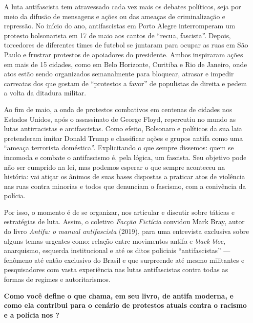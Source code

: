 

A luta antifascista tem atravessado cada vez mais os debates políticos, seja por meio da difusão de mensagens e ações ou das ameaças de criminalização e repressão. No início do ano, antifascistas em Porto Alegre interromperam um protesto bolsonarista em 17 de maio aos cantos de ``recua, fascista''. Depois, torcedores de diferentes times de futebol se juntaram para ocupar as ruas em São Paulo e frustrar protestos de apoiadores do presidente. Ambos inspiraram ações em mais de 15 cidades, como em Belo Horizonte, Curitiba e Rio de Janeiro, onde atos estão sendo organizados semanalmente para bloquear, atrasar e impedir carreatas dos que gostam de ``protestos a favor'' de populistas de direita e pedem a volta da ditadura militar.
 
Ao fim de maio, a onda de protestos combativos em centenas de cidades nos Estados Unidos, após o assassinato de George Floyd, repercutiu no mundo as lutas antirracistas e antifascistas. Como efeito, Bolsonaro e políticos da sua laia pretenderam imitar Donald Trump e classificar ações e grupos antifa como uma ``ameaça terrorista doméstica''. Explicitando o que sempre dissemos: quem se incomoda e combate o antifascismo é, pela lógica, um fascista. Seu objetivo pode não ser cumprido na lei, mas podemos esperar o que sempre aconteceu na história: vai atiçar os ânimos de suas bases dispostas a praticar atos de violência nas ruas contra minorias e todos que denunciam o fascismo, com a conivência da polícia.
 
Por isso, o momento é de se organizar, nos articular e discutir sobre táticas e estratégias de luta. Assim, o coletivo \emph{Facção Fictícia} convidou Mark Bray, autor do livro \emph{Antifa: o manual antifascista} (2019), para uma entrevista exclusiva sobre alguns temas urgentes como: relação entre movimentos antifa e \emph{black bloc}, anarquismo, esquerda institucional e até os ditos policiais ``antifascistas'' --- fenômeno até então exclusivo do Brasil e que surpreende até mesmo militantes e pesquisadores com vasta experiência nas lutas antifascistas contra todas as formas de regimes e autoritarismos.

\bigskip

\noindent{}\textbf{Como você define o que chama, em seu livro, de antifa moderna, e como ela contribui para o cenário de protestos atuais contra o racismo e a polícia nos ?}

